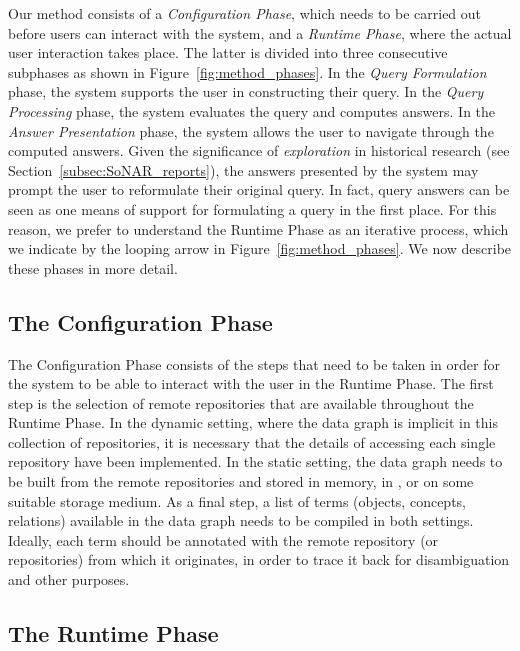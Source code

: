 Our method consists of a \emph{Configuration Phase}, which
needs to be carried out before users can interact with the system,
and a \emph{Runtime Phase}, where the actual user interaction takes place.
The latter is divided into three consecutive subphases as shown in Figure~\ref{fig:method_phases}.
In the \emph{Query Formulation} phase, the system supports the user 
in constructing their query.
In the \emph{Query Processing} phase, the system evaluates the query
and computes answers.
In the \emph{Answer Presentation} phase, the system allows the user to
navigate through the computed answers.
Given the significance of \emph{exploration} in historical research
(see Section~\ref{subsec:SoNAR_reports}),
the answers presented by the system may
prompt the user to reformulate their original query.
In fact, query answers can be seen as one means of support
for formulating a query in the first place.
For this reason, we prefer to understand the Runtime Phase as an iterative process,
which we indicate by the looping arrow in Figure~\ref{fig:method_phases}.
%
We now describe these phases in more detail.

\subsection{The Configuration Phase}
\label{subsec:configuration_phase}

The Configuration Phase consists of the steps that need to be taken
in order for the system to be able to interact with the user in the Runtime Phase.
The first step is the selection of remote repositories that are available 
throughout the Runtime Phase.
In the dynamic setting, where the data graph is implicit in this collection of repositories,
it is necessary that the details of accessing each single repository
have been implemented.
In the static setting, the data graph needs to be built from the remote repositories
and stored in memory, in , or on some suitable storage medium.
As a final step, a list of terms (objects, concepts, relations) available in the data graph
needs to be compiled in both settings. Ideally, each term should be annotated with the remote repository
(or repositories)
from which it originates, in order to trace it back for disambiguation and
other purposes.

\subsection{The Runtime Phase}

